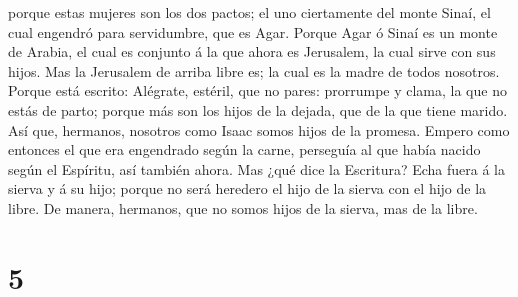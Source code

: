 porque estas mujeres son los dos pactos; el uno ciertamente del monte
Sinaí, el cual engendró para servidumbre, que es Agar. 
Porque Agar ó Sinaí es un monte de Arabia, el cual es conjunto á la que
ahora es Jerusalem, la cual sirve con sus hijos.  Mas la
Jerusalem de arriba libre es; la cual es la madre de todos nosotros.
 Porque está escrito: Alégrate, estéril, que no pares:
prorrumpe y clama, la que no estás de parto; porque más son los hijos de
la dejada, que de la que tiene marido.  Así que,
hermanos, nosotros como Isaac somos hijos de la promesa. 
Empero como entonces el que era engendrado según la carne, perseguía al
que había nacido según el Espíritu, así también ahora. 
Mas ¿qué dice la Escritura? Echa fuera á la sierva y á su hijo; porque
no será heredero el hijo de la sierva con el hijo de la libre.
 De manera, hermanos, que no somos hijos de la sierva,
mas de la libre.

\hypertarget{section-4}{%
\section{5}\label{section-4}}

